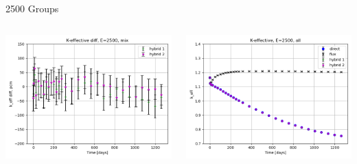 \documentclass[
	11pt, %
	aspectratio=169, %
]{beamer}
\begin{document}
\begin{frame}{2500 Groups}
\begin{columns}[c]
\begin{column}{0.32\textwidth}
			\includegraphics[width=\textwidth]{../figures/keff/keff_mix_2500_diff.png}
		\end{column}
		\begin{column}{0.32\textwidth} %
			\includegraphics[width=\textwidth]{../figures/keff/keff_all_2500.png}


\end{column}
\end{columns}
\end{frame}
\end{document}
